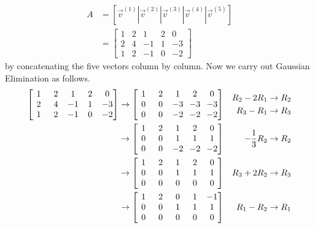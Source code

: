 \begin{align*}
A &= [\vec{v}^{(1)}|\vec{v}^{(2)}|\vec{v}^{(3)}|\vec{v}^{(4)}|\vec{v}^{(5)}] \\
&= 
\begin{bmatrix}
1 & 2 & 1 & 2 & 0 \\
2 & 4 & -1 & 1 & -3\\
1 & 2 & -1 & 0 & -2
\end{bmatrix}
\end{align*}
by concatenating the five vectors column by column. Now we carry out Gaussian Elimination as follows.
\begin{align*}
\left[\begin{array}{@{\,}wc{10pt}wc{10pt}wc{10pt}wc{10pt}wc{10pt}@{\,}}
1 & 2 & 1 & 2 & 0 \\
2 & 4 & -1 & 1 & -3\\
1 & 2 & -1 & 0 & -2
\end{array}\right]
&\to \left[\begin{array}{@{\,}wc{10pt}wc{10pt}wc{10pt}wc{10pt}wc{10pt}@{\,}}
1 & 2 & 1 & 2 & 0 \\
0 & 0 & -3 & -3 & -3\\
0 & 0 & -2 & -2 & -2
\end{array}\right] &
\begin{aligned}
R_2 - 2R_1 &\to R_2 \\
R_3 - R_1 &\to R_3 
\end{aligned} \\
&\to \left[\begin{array}{@{\,}wc{10pt}wc{10pt}wc{10pt}wc{10pt}wc{10pt}@{\,}}
1 & 2 & 1 & 2 & 0 \\
0 & 0 & 1 & 1 & 1 \\
0 & 0 & -2 & -2 & -2
\end{array}\right] &
-\frac{1}{3}R_2 \to R_2 \\
&\to \left[\begin{array}{@{\,}wc{10pt}wc{10pt}wc{10pt}wc{10pt}wc{10pt}@{\,}}
1 & 2 & 1 & 2 & 0 \\
0 & 0 & 1 & 1 & 1 \\
0 & 0 & 0 & 0 & 0
\end{array}\right] &
R_3 + 2R_2 \to R_3 \\
&\to \left[\begin{array}{@{\,}wc{10pt}wc{10pt}wc{10pt}wc{10pt}wc{10pt}@{\,}}
1 & 2 & 0 & 1 & -1 \\
0 & 0 & 1 & 1 & 1 \\
0 & 0 & 0 & 0 & 0
\end{array}\right] &
R_1 - R_2 \to R_1
\end{align*}
